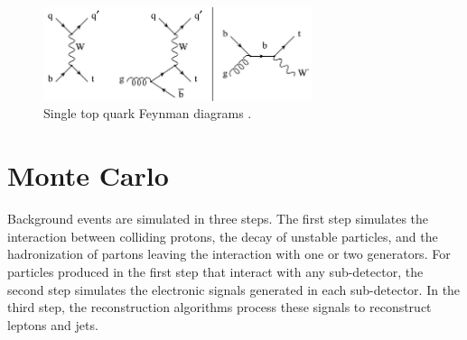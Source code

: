 \begin{figure}[h]
	\centering
	\includegraphics[width=0.7\textwidth]{figures/singleTopQuarkFeynDiagrams.png}
	\caption{Single top quark Feynman diagrams \cite{singleTopQrkDiagrams}.}
	\label{fig:singleTopDiags}
\end{figure}


\section{Monte Carlo}
\label{sec:MC}
Background events are simulated in three steps.  The first 
step simulates the interaction between colliding protons, the decay of unstable particles, and the hadronization of 
partons leaving the interaction with one or two \MC generators.  For particles produced in the first step that interact with 
any sub-detector, the second step simulates the electronic signals generated in each sub-detector.  In the third step, the 
reconstruction algorithms process these signals to reconstruct leptons and jets.

